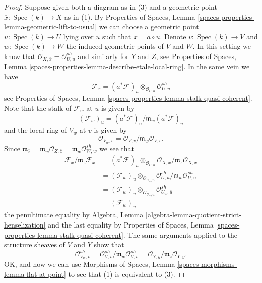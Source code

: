 \documentclass[10pt,a4paper]{amsart}
\theoremstyle{plain}
\theoremstyle{definition}
\theoremstyle{remark}
\numberwithin{equation}{subsection}
\def\Spec{\mathop{\mathrm{Spec}}}
\begin{document}
\begin{proof}
\medskip\noindent
Suppose given both a diagram as in (3) and a geometric point
$\overline{x} : \Spec(k) \to X$ as in (1). By
Properties of Spaces, Lemma
\ref{spaces-properties-lemma-geometric-lift-to-usual}
we can choose a geometric point $\overline{u} : \Spec(k) \to U$
lying over $u$ such that $\overline{x} = a \circ \overline{u}$.
Denote $\overline{v} : \Spec(k) \to V$ and
$\overline{w} : \Spec(k) \to W$ the induced geometric points of
$V$ and $W$. In this setting we know that
$\mathcal{O}_{X, \overline{x}} = \mathcal{O}_{U, u}^{sh}$
and similarly for $Y$ and $Z$, see
Properties of Spaces,
Lemma \ref{spaces-properties-lemma-describe-etale-local-ring}.
In the same vein we have
$$
\mathcal{F}_{\overline{x}} =
(a^*\mathcal{F})_u \otimes_{\mathcal{O}_{U, u}}
\mathcal{O}_{U, u}^{sh}
$$
see
Properties of Spaces, Lemma \ref{spaces-properties-lemma-stalk-quasi-coherent}.
Note that the stalk of $\mathcal{F}_w$ at $u$ is given by
$$
(\mathcal{F}_w)_u = (a^*\mathcal{F})_u/\mathfrak m_w(a^*\mathcal{F})_u
$$
and the local ring of $V_w$ at $v$ is given by
$$
\mathcal{O}_{V_w, v} = \mathcal{O}_{V, v}/\mathfrak m_w\mathcal{O}_{V, v}.
$$
Since $\mathfrak m_{\overline{z}} =
\mathfrak m_w \mathcal{O}_{Z, \overline{z}} =
\mathfrak m_w \mathcal{O}_{W, w}^{sh}$
we see that
\begin{align*}
\mathcal{F}_{\overline{x}}/
\mathfrak m_{\overline{z}}\mathcal{F}_{\overline{x}} & =
(a^*\mathcal{F})_u \otimes_{\mathcal{O}_{U, u}}
\mathcal{O}_{X, \overline{x}}/
\mathfrak m_{\overline{z}}\mathcal{O}_{X, \overline{x}} \\
& =
(\mathcal{F}_w)_u \otimes_{\mathcal{O}_{U_w, u}}
\mathcal{O}_{U, u}^{sh}/\mathfrak m_w\mathcal{O}_{U, u}^{sh} \\
& = (\mathcal{F}_w)_u \otimes_{\mathcal{O}_{U_w, u}}
\mathcal{O}_{U_w, \overline{u}}^{sh} \\
& = (\mathcal{F}_w)_{\overline{u}}
\end{align*}
the penultimate equality by
Algebra, Lemma \ref{algebra-lemma-quotient-strict-henselization}
and the last equality by
Properties of Spaces, Lemma \ref{spaces-properties-lemma-stalk-quasi-coherent}.
The same arguments applied to the structure sheaves of $V$ and $Y$
show that
$$
\mathcal{O}_{V_w, \overline{v}}^{sh} =
\mathcal{O}_{V, v}^{sh}/\mathfrak m_w \mathcal{O}_{V, v}^{sh} =
\mathcal{O}_{Y, \overline{y}}/
\mathfrak m_{\overline{z}}\mathcal{O}_{Y, \overline{y}}.
$$
OK, and now we can use
Morphisms of Spaces, Lemma \ref{spaces-morphisms-lemma-flat-at-point}
to see that (1) is equivalent to (3).


\end{proof}
\end{document}
